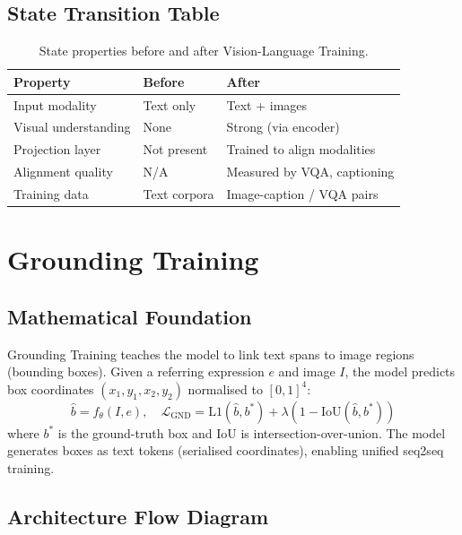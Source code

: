 \subsection{State Transition Table}
\begin{table}[h]\centering
\begin{tabular}{lll}\toprule
\textbf{Property} & \textbf{Before} & \textbf{After}\\\midrule
Input modality & Text only & Text + images\\
Visual understanding & None & Strong (via encoder)\\
Projection layer & Not present & Trained to align modalities\\
Alignment quality & N/A & Measured by VQA, captioning\\
Training data & Text corpora & Image-caption / VQA pairs\\\bottomrule
\end{tabular}
\caption{State properties before and after Vision-Language Training.}
\end{table}

\newpage
\section{Grounding Training}

\subsection{Mathematical Foundation}
Grounding Training teaches the model to link text spans to image regions (bounding boxes). Given a referring expression $e$ and image $I$, the model predicts box coordinates $(x_1,y_1,x_2,y_2)$ normalised to $[0,1]^4$:
\begin{equation}
  \hat{b} = f_\theta(I, e),\quad \mathcal{L}_{\text{GND}} = \text{L1}(\hat{b}, b^*) + \lambda(1 - \text{IoU}(\hat{b}, b^*))
\end{equation}
where $b^*$ is the ground-truth box and IoU is intersection-over-union. The model generates boxes as text tokens (serialised coordinates), enabling unified seq2seq training.

\subsection{Architecture Flow Diagram}

